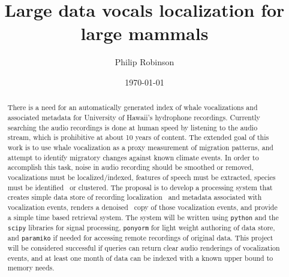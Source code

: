\documentclass[conference]{IEEEtran}
\title{Large data vocals localization for large mammals}
\date{\today}
\author{Philip Robinson}
\affil{Oregon Health Sciences University}
\begin{document}

%


\maketitle

\begin{abstract}
  There is a need for an automatically generated index of whale vocalizations and associated metadata for University of Hawaii's hydrophone recordings. Currently searching the audio recordings is done at human speed by listening to the audio stream, which is prohibitive at about 10 years of content. The extended goal of this work is to use whale vocalization as a proxy measurement of migration patterns, and attempt to identify migratory changes against known climate events. In order to accomplish this task, noise in audio recording should be smoothed or removed, vocalizations must be localized/indexed, features of speech must be extracted, species must be identified~\cite{2014ASAJ} or clustered. The proposal is to develop a processing system that creates simple data store of recording localization~\cite{witten_1985} and metadata associated with vocalization events, renders a denoised~\cite{Baskar2015StudyOD} copy of those vocalization events, and provide a simple time based retrieval system. The system will be written using \texttt{python} and the \texttt{scipy} libraries for signal processing, \texttt{ponyorm} for light weight authoring of data store, and \texttt{paramiko} if needed for accessing remote recordings of original data. This project will be considered successful if queries can return clear audio renderings of vocalization events, and at least one month of data can be indexed with a known upper bound to memory needs.
\end{abstract}
\begin{comment}
\section{Introduction}
\section{Prior Work}
\section{Methods}
\section{Materials}
\section{Results}
\section{Discussion}
\subsection{Study Assumptions}
\subsection{Data Acquisition}
\end{comment}
{}

\end{document}
